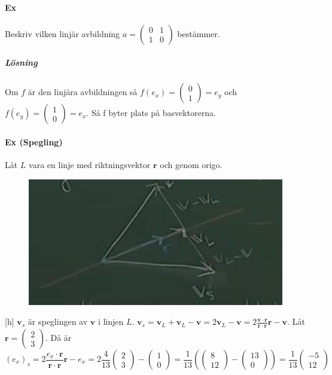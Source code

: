\paragraph{Ex} Beskriv vilken linjär avbildning $a=\begin{pmatrix}0&1\\1&0\end{pmatrix}$ bestämmer.
\subparagraph{Lösning} Om $f$ är den linjära avbildningen så $f(e_{x})=\begin{pmatrix}0\\1\end{pmatrix}=e_{y}$
och $f(e_{y})=\begin{pmatrix}1\\0\end{pmatrix}=e_{x}$.
Så f byter  plats på basvektorerna.

\paragraph{Ex (Spegling)} Låt $L$ vara en linje med riktningsvektor $\bm{r}$ och genom origo.
\begin{figure}
    \includegraphics[scale=0.35]{imgs/img03.png}
\end{figure}[h]
$\bm{v}_{s}$ är speglingen av $\bm{v}$ i linjen $L$.
$\bm{v}_{s}=\bm{v}_{L}+\bm{v}_{L}-\bm{v}=2\bm{v}_{L}-\bm{v}=2\frac{\bm{v}\cdot \bm{r}}{\bm{r}\cdot \bm{r}}\bm{r}-\bm{v}$.
Låt $\bm{r}=\begin{pmatrix}2\\3\end{pmatrix}$.
Då är 
\begin{equation*}
    (e_{x})_{s}=2\frac{e_{x}\cdot \bm{r}}{\bm{r}\cdot \bm{r}}\bm{r}-e_{x}=2\frac{4}{13}\begin{pmatrix}2\\3\end{pmatrix}-\begin{pmatrix}1\\0\end{pmatrix}=
    \frac{1}{13}(\begin{pmatrix}8\\12\end{pmatrix}-\begin{pmatrix}13\\0\end{pmatrix})=\frac{1}{13}\begin{pmatrix}-5\\12\end{pmatrix}
\end{equation*}
